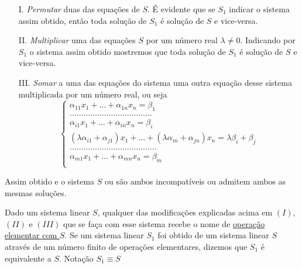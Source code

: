 \begin{itemize}
	\item[I.] \textit{Permutar} duas das equações de $S$. É evidente que se $S_{1}$ indicar o sistema assim obtido, então toda solução de $S_{1}$ é solução de $S$ e vice-versa.
	\item[II.] \textit{Multiplicar} uma das equações $S$ por um número real $\lambda \neq 0$. Indicando por $S_{1}$ o sistema assim obtido mostremos que toda solução de $S_{1}$ é solução de $S$ e vice-versa.
	\item [III.] \textit{Somar} a uma das equações do sistema uma outra equação desse sistema multiplicada por um número real, ou seja
	 \begin{equation*}
	 \begin{cases}
	 \alpha_{11}x_{1}+...+\alpha_{1n}x_{n}=\beta_{1}\\
	 ....................................\\
	 \alpha_{i1}x_{1}+...+\alpha_{in}x_{n}=\beta_{i}\\
	 (\lambda\alpha_{i1}+\alpha_{j1})x_{1}+...+(\lambda\alpha_{in}+\alpha_{jn})x_{n}=\lambda\beta_{i}+\beta_{j} \\
	 ......................................\\
	 \alpha_{m1}x_{1}+...+\alpha_{mn}x_{n}=\beta_{m}\\
	 \end{cases}
	 \end{equation*}   
\end{itemize}
Assim obtido e o sistema $S$ ou são ambos incompatíveis ou admitem ambos as mesmas soluções.
\begin{df}
	Dado um sistema linear $S$, qualquer das modificações explicadas acima em $(I)$, $(II)$ e $(III)$ que se faça com esse sistema recebe o nome de \underline{operação elementar com $S$}. Se um sistema linear $S_{1}$ foi obtido de um sistema linear $S$ através de um número finito de operações elementares, dizemos que $S_{1}$ é equivalente a $S$. Notação $S_{1}\equiv S$	
\end{df}
